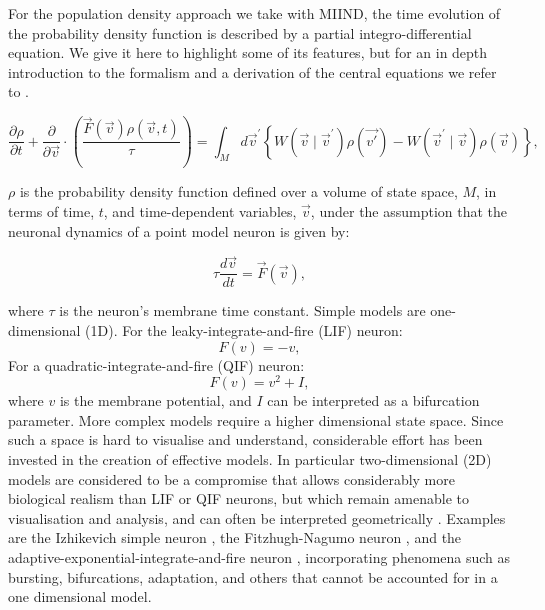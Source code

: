 \documentclass[utf8]{frontiersSCNS} %
\begin{document}
For the population density approach we take with MIIND, the time evolution of the probability density function is described by a partial integro-differential equation. We give it here to highlight some of its features, but for an in depth introduction to the formalism and a derivation of the central equations we refer to \cite{omurtag2000}.

\begin{equation}                                        
  \frac{ \partial \rho }{ \partial t } + \frac{\partial}{ \partial \vec{v}} \cdot ( \frac{\vec{F}(\vec{v}) \rho(\vec{v},t)}{\tau} ) = \int_{M} d \vec{v}^{\prime} \left\{ W(\vec{v} \mid \vec{v}^{\prime})\rho(\vec{v'}) - W(\vec{v}^{\prime} \mid \vec{v}  )\rho(\vec{v}) \right\},
\label{eq-balance}                                          
\end{equation}  

$\rho$ is the probability density function defined over a volume of state space, $M$, in terms of time, $t$, and time-dependent variables, $\vec{v}$, under the assumption that the neuronal dynamics of a point model neuron is given by:

\begin{equation}
\tau \frac{ d \vec{v}}{dt} = \vec{F}(\vec{v}), 
\end{equation}

where $\tau$ is the neuron's membrane time constant. Simple models are one-dimensional (1D). 
For the leaky-integrate-and-fire (LIF) neuron: 
\begin{equation}
F(v) = -v,
\end{equation}  
For a quadratic-integrate-and-fire (QIF) neuron:
\begin{equation}
F(v)= v^2 + I,
\end{equation}  
where $v$ is the membrane potential, and $I$ can be interpreted as a bifurcation parameter. More complex models require a higher dimensional state space. Since such a space is hard to visualise and understand, considerable effort has been invested in the creation of effective models. In particular two-dimensional (2D) models are considered to be a compromise that allows considerably more biological realism than LIF or QIF neurons, but which remain amenable to visualisation and analysis, and can often be interpreted geometrically \citep{izhikevich2007dynamical}. Examples are the Izhikevich simple neuron \citep{izhikevich2003simple}, the Fitzhugh-Nagumo neuron \citep{fitzhugh1961impulses,nagumo1962active}, and the adaptive-exponential-integrate-and-fire neuron \citep{brette2005}, incorporating phenomena such as bursting, bifurcations, adaptation, and others that cannot be accounted for in a one dimensional model.
\end{document}
